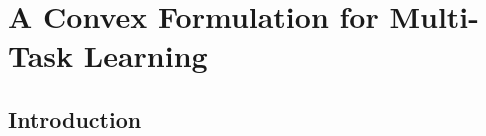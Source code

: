 
\chapter{A Convex Formulation for Multi-Task Learning} %
\label{Chapter4}

{\bf \small{

}}

\section{Introduction}











